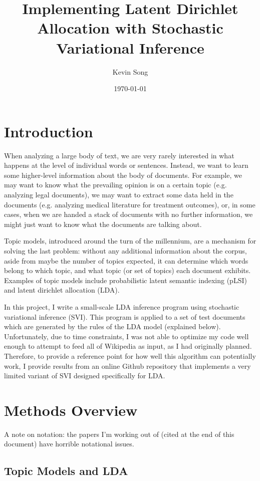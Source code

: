 \documentclass{article}
\author{Kevin Song}
\title{Implementing Latent Dirichlet Allocation with Stochastic Variational
  Inference}
\date{\today}
\begin{document}
\maketitle

\section{Introduction}

When analyzing a large body of text, we are very rarely interested in what
happens at the level of individual words or sentences. Instead, we want to
learn some higher-level information about the body of documents. For example, we
may want to know what the prevailing opinion is on a certain topic (e.g.
analyzing legal documents), we may want to extract some data held in the
documents (e.g. analyzing medical literature for treatment outcomes), or, in
some cases, when we are handed a stack of documents with no further information,
we might just want to know what the documents are talking about.

Topic models, introduced around the turn of the millennium, are a mechanism for
solving the last problem: without any additional information about the corpus,
aside from maybe the number of topics expected, it can determine which words
belong to which topic, and what topic (or set of topics) each document exhibits.
Examples of topic models include probabilistic latent semantic indexing (pLSI)
and latent dirichlet allocation (LDA).

In this project, I write a small-scale LDA inference program using stochastic
variational inference (SVI). This program is applied to a set of test documents which
are generated by the rules of the LDA model (explained below). Unfortunately,
due to time constraints, I was not able to optimize my code well enough to
attempt to feed all of Wikipedia as input, as I had originally planned.
Therefore, to provide a reference point for how well this algorithm can
potentially work, I provide results from an online Github repository that
implements a very limited variant of SVI designed specifically for LDA.

\section{Methods Overview}

A note on notation: the papers I'm working out of (cited at the end of this
document) have horrible notational issues.

\subsection{Topic Models and LDA}
\end{document}

